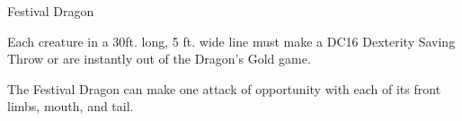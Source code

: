 \begin{DndMonster}[width=0.5\textwidth]{Festival Dragon}
	\DndMonsterAttack[
		name=Tail,
		distance=melee, %
		mod=-2,
		reach=20,
		targets=one target,
		dmg=\DndDice{1d6 - 2},
		dmg-type=bludgeoning,
		extra={ (minimum of 1 damage)},
	]
	
	Each creature in a 30ft. long, 5 ft. wide line must make a DC16 Dexterity Saving Throw or are instantly out of the Dragon's Gold game.
	
	The Festival Dragon can make one attack of opportunity with each of its front limbs, mouth, and tail.
\end{DndMonster}